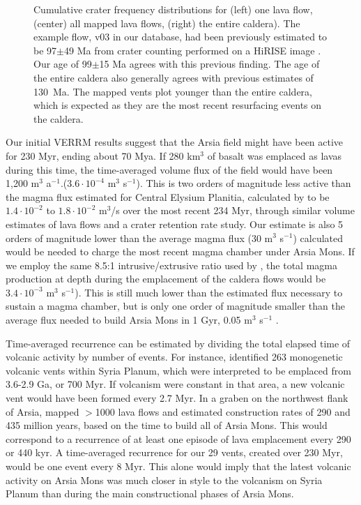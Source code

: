 \documentclass[12pt,letter]{article}
\begin{document}
\begin{figure}
\begin{subfigure}{.33\textwidth}
\end{subfigure}
\caption{Cumulative crater frequency distributions for (left) one lava flow, (center) all mapped lava flows, (right) the entire caldera). The example flow, v03 in our database, had been previously estimated to be 97$\pm$49 Ma from crater counting performed on a HiRISE image \citep{robbins2011volcanic}. Our age of 99$\pm$15 Ma agrees with this previous finding. The age of the entire caldera also generally agrees with previous estimates of 130~Ma. The mapped vents plot younger than the entire caldera, which is expected as they are the most recent resurfacing events on the caldera.}
\label{fig_craterct}
\end{figure}

Our initial VERRM results suggest that the Arsia field might have been active for 230 Myr, ending about 70 Mya. If 280 km$^3$ of basalt was emplaced as lavas during this time, the time-averaged volume flux of the field would have been 1,200 m$^3$ a$^{-1}$.($3.6\cdot 10^{-4}$ m$^3$ s$^{-1}$). This is two orders of magnitude less active than the magma flux estimated for Central Elysium Planitia, calculated by \citet{vaucher2009volcanic} to be $1.4\cdot 10^{-2}$ to $1.8\cdot 10^{-2}$ m$^3$/s over the most recent 234 Myr, through similar volume estimates of lava flows and a crater retention rate study. Our estimate is also 5 orders of magnitude lower than the average magma flux (30 m$^3$ s$^{-1}$) \citet{wilson2001evidence} calculated would be needed to charge the most recent magma chamber under Arsia Mons. If we employ the same 8.5:1 intrusive/extrusive ratio used by \citet{greeley1991magma}, the total magma production at depth during the emplacement of the caldera flows would be $3.4\cdot 10^{-3}$ m$^3$ s$^{-1}$). This is still much lower than the estimated flux necessary to sustain a magma chamber, but is only one order of magnitude smaller than the average flux needed to build Arsia Mons in 1 Gyr, 0.05 m$^3$ s$^{-1}$ \citep{wilson2001evidence}.

Time-averaged recurrence can be estimated by dividing the total elapsed time of volcanic activity by number of events. For instance, \citet{richardson2013volcanic} identified 263 monogenetic volcanic vents within Syria Planum, which were interpreted to be emplaced from 3.6-2.9 Ga, or 700 Myr. If volcanism were constant in that area, a new volcanic vent would have been formed every 2.7 Myr. In a graben on the northwest flank of Arsia, \citet{mouginis2008lava} mapped $>$1000 lava flows and estimated construction rates of 290 and 435 million years, based on the time to build all of Arsia Mons. This would correspond to a recurrence of at least one episode of lava emplacement every 290 or 440 kyr. A time-averaged recurrence for our 29 vents, created over 230 Myr, would be one event every 8 Myr. This alone would imply that the latest volcanic activity on Arsia Mons was much closer in style to the volcanism on Syria Planum than during the main constructional phases of Arsia Mons.
\end{document}
